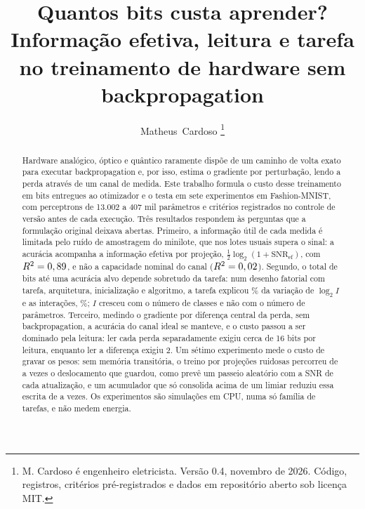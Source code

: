 \documentclass[journal]{IEEEtran}
\newcommand{\SNR}{\mathrm{SNR}}
\begin{document}
\title{Quantos bits custa aprender? Informação efetiva, leitura e tarefa no treinamento de hardware sem backpropagation}

\author{Matheus~Cardoso%
\thanks{M. Cardoso é engenheiro eletricista. Versão 0.4, novembro de 2026. Código, registros, critérios pré-registrados e dados em repositório aberto sob licença MIT.}}


\maketitle

\begin{abstract}
Hardware analógico, óptico e quântico raramente dispõe de um caminho de volta exato para executar backpropagation e, por isso, estima o gradiente por perturbação, lendo a perda através de um canal de medida. Este trabalho formula o custo desse treinamento em bits entregues ao otimizador e o testa em sete experimentos em Fashion-MNIST, com perceptrons de 13.002 a 407 mil parâmetros e critérios registrados no controle de versão antes de cada execução. Três resultados respondem às perguntas que a formulação original deixava abertas. Primeiro, a informação útil de cada medida é limitada pelo ruído de amostragem do minilote, que nos lotes usuais supera o sinal: a acurácia acompanha a informação efetiva por projeção, $\tfrac12\log_2(1+\SNR_{\text{ef}})$, com $R^2 = 0,89$, e não a capacidade nominal do canal ($R^2 = 0,02$). Segundo, o total de bits até uma acurácia alvo depende sobretudo da tarefa: num desenho fatorial com tarefa, arquitetura, inicialização e algoritmo, a tarefa explicou \EtrezeTarefa\% da variação de $\log_2 I$ e as interações, \EtrezeInter\%; $I$ cresceu com o número de classes e não com o número de parâmetros. Terceiro, medindo o gradiente por diferença central da perda, sem backpropagation, a acurácia do canal ideal se manteve, e o custo passou a ser dominado pela leitura: ler cada perda separadamente exigiu cerca de 16 bits por leitura, enquanto ler a diferença exigiu 2. Um sétimo experimento mede o custo de gravar os pesos: sem memória transitória, o treino por projeções ruidosas percorreu de \EdezesseteRhoMin{} a \EdezesseteRhoMax{} vezes o deslocamento que guardou, como prevê um passeio aleatório com a SNR de cada atualização, e um acumulador que só consolida acima de um limiar reduziu essa escrita de \EdezesseteGmin{} a \EdezesseteGmax{} vezes. Os experimentos são simulações em CPU, numa só família de tarefas, e não medem energia.
\end{abstract}
\end{document}
